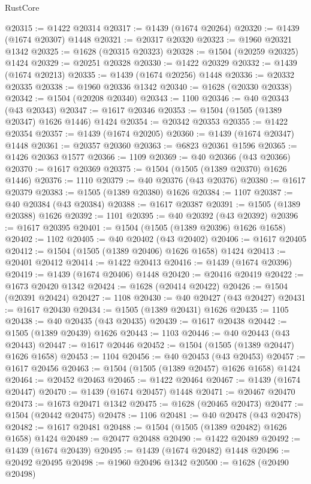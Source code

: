 \begin{lexlean}{RustCore}
\begin{coremodule}
@20315 := @1422 @20314
@20317 := @1439 (@1674 @20264)
@20320 := @1439 (@1674 @20307) @1448
@20321 := @20317 @20320
@20323 := @1960 @20321 @1342
@20325 := @1628 (@20315 @20323)
@20328 := @1504 (@20259 @20325) @1424
@20329 := @20251 @20328
@20330 := @1422 @20329
@20332 := @1439 (@1674 @20213)
@20335 := @1439 (@1674 @20256) @1448
@20336 := @20332 @20335
@20338 := @1960 @20336 @1342
@20340 := @1628 (@20330 @20338)
@20342 := @1504 (@20208 @20340)
@20343 := 1100
@20346 := @40 @20343 (@43 @20343)
@20347 := @1617 @20346
@20353 := @1504 (@1505 (@1389 @20347) @1626 @1446) @1424
@20354 := @20342 @20353
@20355 := @1422 @20354
@20357 := @1439 (@1674 @20205)
@20360 := @1439 (@1674 @20347) @1448
@20361 := @20357 @20360
@20363 := @6823 @20361 @1596
@20365 := @1426 @20363 @1577
@20366 := 1109
@20369 := @40 @20366 (@43 @20366)
@20370 := @1617 @20369
@20375 := @1504 (@1505 (@1389 @20370) @1626 @1446)
@20376 := 1110
@20379 := @40 @20376 (@43 @20376)
@20380 := @1617 @20379
@20383 := @1505 (@1389 @20380) @1626
@20384 := 1107
@20387 := @40 @20384 (@43 @20384)
@20388 := @1617 @20387
@20391 := @1505 (@1389 @20388) @1626
@20392 := 1101
@20395 := @40 @20392 (@43 @20392)
@20396 := @1617 @20395
@20401 := @1504 (@1505 (@1389 @20396) @1626 @1658)
@20402 := 1102
@20405 := @40 @20402 (@43 @20402)
@20406 := @1617 @20405
@20412 := @1504 (@1505 (@1389 @20406) @1626 @1658) @1424
@20413 := @20401 @20412
@20414 := @1422 @20413
@20416 := @1439 (@1674 @20396)
@20419 := @1439 (@1674 @20406) @1448
@20420 := @20416 @20419
@20422 := @1673 @20420 @1342
@20424 := @1628 (@20414 @20422)
@20426 := @1504 (@20391 @20424)
@20427 := 1108
@20430 := @40 @20427 (@43 @20427)
@20431 := @1617 @20430
@20434 := @1505 (@1389 @20431) @1626
@20435 := 1105
@20438 := @40 @20435 (@43 @20435)
@20439 := @1617 @20438
@20442 := @1505 (@1389 @20439) @1626
@20443 := 1103
@20446 := @40 @20443 (@43 @20443)
@20447 := @1617 @20446
@20452 := @1504 (@1505 (@1389 @20447) @1626 @1658)
@20453 := 1104
@20456 := @40 @20453 (@43 @20453)
@20457 := @1617 @20456
@20463 := @1504 (@1505 (@1389 @20457) @1626 @1658) @1424
@20464 := @20452 @20463
@20465 := @1422 @20464
@20467 := @1439 (@1674 @20447)
@20470 := @1439 (@1674 @20457) @1448
@20471 := @20467 @20470
@20473 := @1673 @20471 @1342
@20475 := @1628 (@20465 @20473)
@20477 := @1504 (@20442 @20475)
@20478 := 1106
@20481 := @40 @20478 (@43 @20478)
@20482 := @1617 @20481
@20488 := @1504 (@1505 (@1389 @20482) @1626 @1658) @1424
@20489 := @20477 @20488
@20490 := @1422 @20489
@20492 := @1439 (@1674 @20439)
@20495 := @1439 (@1674 @20482) @1448
@20496 := @20492 @20495
@20498 := @1960 @20496 @1342
@20500 := @1628 (@20490 @20498)

\end{coremodule}
\end{lexlean}
